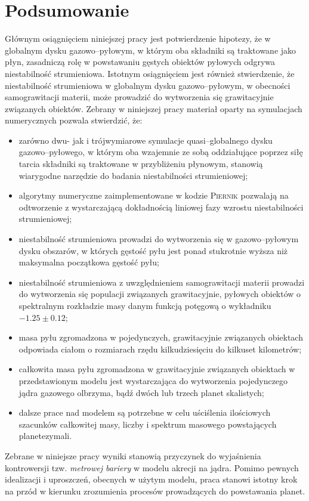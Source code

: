 
\chapter{Podsumowanie}

Głównym osiągnięciem niniejszej pracy jest potwierdzenie hipotezy, że w globalnym
dysku gazowo--pyłowym, w którym oba składniki są traktowane jako płyn, zasadniczą
rolę w
powstawaniu gęstych obiektów pyłowych odgrywa niestabilność strumieniowa. 
Istotnym osiągnięciem jest również stwierdzenie, że niestabilność
strumieniowa w globalnym dysku gazowo--pyłowym, w obecności samograwitacji
materii, może prowadzić do wytworzenia się grawitacyjnie związanych obiektów.
Zebrany w niniejszej pracy materiał oparty na symulacjach numerycznych
pozwala stwierdzić, że:

\begin{itemize}
   \item zarówno dwu- jak i trójwymiarowe symulacje quasi--globalnego dysku
      gazowo--py\-ło\-we\-go, w którym oba wzajemnie ze sobą oddziałujące poprzez siłę
      tarcia składniki są traktowane w przybliżeniu płynowym, stanowią wiarygodne
      narzędzie do badania niestabilności strumieniowej;
   \item algorytmy numeryczne zaimplementowane w kodzie \textsc{Piernik}
      pozwalają na odtworzenie z wystarczającą dokładnością liniowej fazy
      wzrostu niestabilności strumieniowej;
   \item niestabilność strumieniowa prowadzi do wytworzenia się w gazowo--pyłowym
      dysku obszarów, w których gęstość pyłu jest ponad stukrotnie wyższa niż
      maksymalna początkowa gęstość pyłu;
   \item niestabilność strumieniowa z uwzględnieniem samograwitacji materii
      prowadzi do wytworzenia się populacji związanych grawitacyjnie, pyłowych
      obiektów o spektralnym rozkładzie masy danym funkcją potęgową o wykładniku
      $-1.25\pm0.12$;
   \item masa pyłu zgromadzona w pojedynczych, grawitacyjnie związanych obiektach
      odpowiada ciałom o rozmiarach rzędu kilkudziesięciu do kilkuset
      kilometrów;
   \item całkowita masa pyłu zgromadzona w grawitacyjnie związanych obiektach w
      przedstawionym modelu 
      jest wystarczająca do wytworzenia pojedynczego jądra gazowego
      olbrzyma, bądź dwóch lub trzech planet skalistych;
   \item dalsze prace nad modelem są potrzebne w celu uściślenia ilościowych
      szacunków całkowitej masy, liczby i spektrum masowego powstających
      planetezymali.
\end{itemize}
Zebrane w niniejsze pracy wyniki stanowią przyczynek do wyjaśnienia
kontrowersji tzw. \emph{metrowej bariery} w modelu akrecji na
jądra. Pomimo pewnych idealizacji i uproszczeń, obecnych w użytym modelu, praca
stanowi istotny krok na przód w kierunku zrozumienia procesów
prowadzących do powstawania planet.

